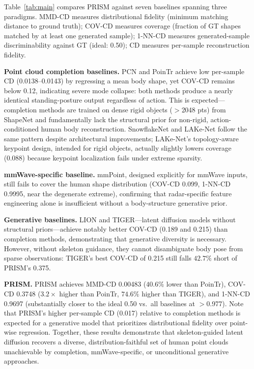 \documentclass{article}
\begin{document}
Table~\ref{tab:main} compares PRISM against seven baselines spanning three paradigms.
MMD-CD measures distributional fidelity (minimum matching distance to ground truth);
COV-CD measures coverage (fraction of GT shapes matched by at least one generated
sample); 1-NN-CD measures generated-sample discriminability against GT (ideal: 0.50);
CD measures per-sample reconstruction fidelity.

\textbf{Point cloud completion baselines.}
PCN and PoinTr achieve low per-sample CD (0.0138--0.0143) by regressing a mean
body shape, yet COV-CD remains below 0.12, indicating severe mode collapse: both
methods produce a nearly identical standing-posture output regardless of action.
This is expected---completion methods are trained on dense rigid objects
($>$2048 pts) from ShapeNet and fundamentally lack the structural prior for
non-rigid, action-conditioned human body reconstruction.
SnowflakeNet and LAKe-Net follow the same pattern despite architectural improvements;
LAKe-Net's topology-aware keypoint design, intended for rigid objects, actually
slightly lowers coverage (0.088) because keypoint localization fails under extreme
sparsity.

\textbf{mmWave-specific baseline.}
mmPoint, designed explicitly for mmWave inputs, still fails to cover the human
shape distribution (COV-CD 0.099, 1-NN-CD 0.9995, near the degenerate extreme),
confirming that radar-specific feature engineering alone is insufficient without
a body-structure generative prior.

\textbf{Generative baselines.}
LION and TIGER---latent diffusion models without structural priors---achieve
notably better COV-CD (0.189 and 0.215) than completion methods, demonstrating
that generative diversity is necessary.
However, without skeleton guidance, they cannot disambiguate body pose from
sparse observations: TIGER's best COV-CD of 0.215 still falls $\mathbf{42.7\%}$
short of PRISM's 0.375.

\textbf{PRISM.}
PRISM achieves MMD-CD 0.00483 ($\mathbf{40.6\%}$ lower than PoinTr),
COV-CD 0.3748 ($\mathbf{3.2\!\times}$ higher than PoinTr,
$\mathbf{74.6\%}$ higher than TIGER),
and 1-NN-CD 0.9697 (substantially closer to the ideal 0.50 vs.\ all baselines
at $>$0.977).
Note that PRISM's higher per-sample CD (0.017) relative to completion methods
is expected for a generative model that prioritizes distributional fidelity over
point-wise regression.
Together, these results demonstrate that skeleton-guided latent diffusion
recovers a diverse, distribution-faithful set of human point clouds unachievable
by completion, mmWave-specific, or unconditional generative approaches.
\end{document}
